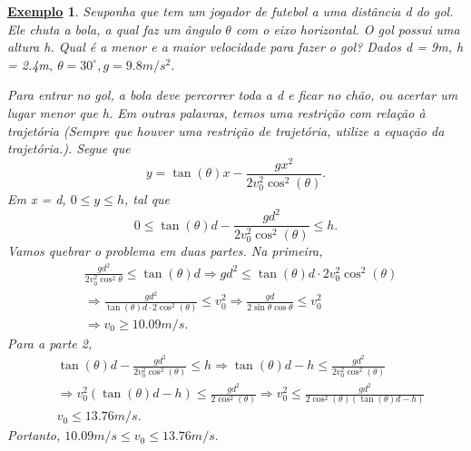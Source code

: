 \documentclass{article}
\newtheorem{example}{\underline{Exemplo}}
\begin{document}
\begin{example}
  Seuponha que tem um jogador de futebol a uma dist\^ancia d do gol. Ele chuta a bola, a qual faz um \^angulo $\theta $ com o 
eixo horizontal. O gol possui uma altura h. Qual \'e a menor e a maior velocidade para fazer o gol? Dados d = 9m, h = 2.4m, $\theta =30^{\circ}, g=9.8m/s^{2}.$

  Para entrar no gol, a bola deve percorrer toda a d e ficar no ch\~ao, ou acertar um lugar menor que h. Em outras palavras,
  temos uma restri\c c\~ao com rela\c c\~ao \`a trajet\'oria (Sempre que houver uma restri\c c\~ao de trajet\'oria, utilize a equa\c c\~ao da trajet\'oria.).
  Segue que 
    $$
    y = \tan{(\theta)}x - \frac{gx^{2}}{2v_{0}^{2}\cos^{2}{(\theta )}}.
    $$
  Em x = d, $0\leq y\leq h$, tal que 
    $$
    0\leq \tan{(\theta)}d - \frac{gd^{2}}{2v_{0}^{2}\cos^{2}{(\theta )}}\leq h.
    $$
  Vamos quebrar o problema em duas partes. Na primeira, 
 \begin{align*}
   &\frac{gd^{2}}{2v_{0}^{2}\cos^{2}{\theta }}\leq \tan{(\theta )}d \Rightarrow gd^{2}\leq \tan{(\theta )}d \cdot 2v_{0}^{2}\cos^{2}{(\theta)}\\
   & \Rightarrow \frac{gd^{2}}{\tan{(\theta )}d \cdot 2\cos^{2}{(\theta )}}\leq v_{0}^{2} \Rightarrow  \frac{gd}{2\sin{\theta }\cos{\theta }}\leq v_{0}^{2}\\
   & \Rightarrow v_{0}\geq 10.09m/s.
 \end{align*}  
 Para a parte 2,
 \begin{align*}
   &\tan{(\theta )}d - \frac{gd^{2}}{2v_{0}^{2}\cos^{2}{(\theta )}}\leq  h \Rightarrow \tan{(\theta )}d - h\leq \frac{gd^{2}}{2v_{0}^{2}\cos^{2}{(\theta )}}\\
   & \Rightarrow v_{0}^{2}(\tan{(\theta )}d - h)\leq \frac{gd^{2}}{2\cos^{2}{(\theta )}} \Rightarrow  v_{0}^{2}\leq \frac{gd^{2}}{2\cos^{2}{(\theta )}(\tan{(\theta )}d-h)}\\
   & v_{0}\leq 13.76m/s.
 \end{align*}
 Portanto, $10.09m/s\leq v_{0}\leq 13.76m/s.$
\end{example}
\end{document}
